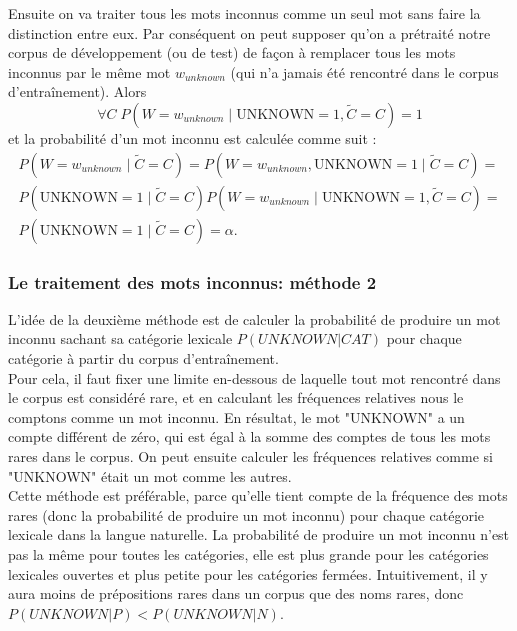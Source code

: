 \documentclass[12pt]{article}
\begin{document}
Ensuite on va traiter tous les mots inconnus comme un seul mot sans faire la
distinction entre eux.
Par cons\'equent on peut supposer qu'on a pr\'etrait\'e notre corpus de
d\'eveloppement (ou de test) de façon \`a remplacer tous les mots inconnus par le
m\^eme mot $w_{unknown}$ (qui n'a jamais \'et\'e rencontr\'e dans le corpus
d'entra\^inement). Alors $$\forall C \; P(W = w_{unknown} \mid \mathrm{UNKNOWN} =
1, \tilde{C} = C) = 1$$ et la probabilit\'e d'un mot inconnu est calcul\'ee comme
suit :
\begin{multline}
\label{prob_mot_inconnu_1}
 P(W = w_{unknown} \mid \tilde{C} = C) = P(W = w_{unknown}, \mathrm{UNKNOWN} = 1 \mid \tilde{C} = C) =
 \\
 P(\mathrm{UNKNOWN} = 1 \mid \tilde{C} = C) P(W = w_{unknown} \mid \mathrm{UNKNOWN} = 1, \tilde{C} = C) =
 \\
 P(\mathrm{UNKNOWN} = 1 \mid \tilde{C} = C) = \alpha.
\end{multline}

\subsubsection{Le traitement des mots inconnus: m\'ethode 2}

L'id\'ee de la deuxi\`eme m\'ethode est de calculer la probabilit\'e de
produire un mot inconnu sachant sa cat\'egorie lexicale $P(UNKNOWN|CAT)$ pour
chaque cat\'egorie \`a partir du corpus d'entra\^inement.\\

Pour cela, il faut fixer une limite en-dessous de laquelle tout mot rencontr\'e dans le corpus est
consid\'er\'e rare, et en calculant les fr\'equences relatives nous le comptons comme
un mot inconnu. En r\'esultat, le mot "UNKNOWN" a un compte diff\'erent de z\'ero, qui
est \'egal \`a la somme des comptes de tous les mots rares dans le corpus. On peut
ensuite calculer les fr\'equences relatives comme si "UNKNOWN" \'etait un mot comme
les autres. 
\\

Cette m\'ethode est pr\'ef\'erable, parce qu'elle tient compte de la
fr\'equence des mots rares (donc la probabilit\'e de produire un mot inconnu) pour
chaque cat\'egorie lexicale dans la langue naturelle. La probabilit\'e
de produire un mot inconnu n'est pas la m\^eme pour toutes les
cat\'egories, elle est plus grande pour les cat\'egories lexicales ouvertes et plus
petite pour les cat\'egories ferm\'ees.
Intuitivement, il y aura moins de pr\'epositions rares dans un corpus que des noms rares, donc $P(UNKNOWN|P) < P(UNKNOWN|N)$.
\\
\end{document}
